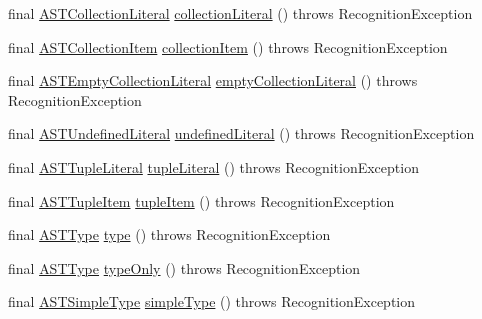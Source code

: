 \begin{DoxyCompactItemize}
final \hyperlink{classorg_1_1tzi_1_1use_1_1parser_1_1ocl_1_1_a_s_t_collection_literal}{A\-S\-T\-Collection\-Literal} \hyperlink{classorg_1_1tzi_1_1use_1_1parser_1_1soil_1_1_soil_parser_a03e1416af7e8a536f1a0174af8590311}{collection\-Literal} ()  throws Recognition\-Exception 
\item 
final \hyperlink{classorg_1_1tzi_1_1use_1_1parser_1_1ocl_1_1_a_s_t_collection_item}{A\-S\-T\-Collection\-Item} \hyperlink{classorg_1_1tzi_1_1use_1_1parser_1_1soil_1_1_soil_parser_a809c29edbcc425f3f236c9d52c536c05}{collection\-Item} ()  throws Recognition\-Exception 
\item 
final \hyperlink{classorg_1_1tzi_1_1use_1_1parser_1_1ocl_1_1_a_s_t_empty_collection_literal}{A\-S\-T\-Empty\-Collection\-Literal} \hyperlink{classorg_1_1tzi_1_1use_1_1parser_1_1soil_1_1_soil_parser_a9bf03a77a7b273ac5a359d71a49c961f}{empty\-Collection\-Literal} ()  throws Recognition\-Exception 
\item 
final \hyperlink{classorg_1_1tzi_1_1use_1_1parser_1_1ocl_1_1_a_s_t_undefined_literal}{A\-S\-T\-Undefined\-Literal} \hyperlink{classorg_1_1tzi_1_1use_1_1parser_1_1soil_1_1_soil_parser_a2605b4aaec42783dceb5d4a4647e73af}{undefined\-Literal} ()  throws Recognition\-Exception 
\item 
final \hyperlink{classorg_1_1tzi_1_1use_1_1parser_1_1ocl_1_1_a_s_t_tuple_literal}{A\-S\-T\-Tuple\-Literal} \hyperlink{classorg_1_1tzi_1_1use_1_1parser_1_1soil_1_1_soil_parser_a0d7f27a6bc949451ff9b07fdcb4039ca}{tuple\-Literal} ()  throws Recognition\-Exception 
\item 
final \hyperlink{classorg_1_1tzi_1_1use_1_1parser_1_1ocl_1_1_a_s_t_tuple_item}{A\-S\-T\-Tuple\-Item} \hyperlink{classorg_1_1tzi_1_1use_1_1parser_1_1soil_1_1_soil_parser_a1a06034d808b465cd10698af60182255}{tuple\-Item} ()  throws Recognition\-Exception 
\item 
final \hyperlink{classorg_1_1tzi_1_1use_1_1parser_1_1ocl_1_1_a_s_t_type}{A\-S\-T\-Type} \hyperlink{classorg_1_1tzi_1_1use_1_1parser_1_1soil_1_1_soil_parser_a6835b6b0eee7157c3e33378b71df2553}{type} ()  throws Recognition\-Exception 
\item 
final \hyperlink{classorg_1_1tzi_1_1use_1_1parser_1_1ocl_1_1_a_s_t_type}{A\-S\-T\-Type} \hyperlink{classorg_1_1tzi_1_1use_1_1parser_1_1soil_1_1_soil_parser_a04e70d5bf58adcad413a16c42e3f0947}{type\-Only} ()  throws Recognition\-Exception 
\item 
final \hyperlink{classorg_1_1tzi_1_1use_1_1parser_1_1ocl_1_1_a_s_t_simple_type}{A\-S\-T\-Simple\-Type} \hyperlink{classorg_1_1tzi_1_1use_1_1parser_1_1soil_1_1_soil_parser_a398fbf684950208024e611097bce227d}{simple\-Type} ()  throws Recognition\-Exception 

\end{DoxyCompactItemize}
